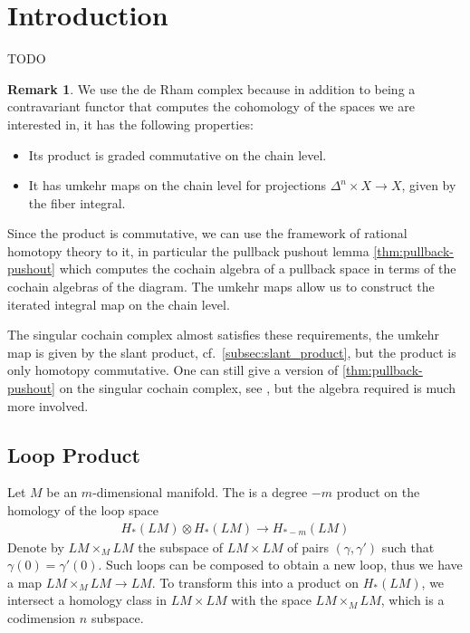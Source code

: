 \documentclass{scrartcl}
\let\emph\relax
\newcommand{\emphi}[1]{\index{#1}\emph{#1}}
\theoremstyle{plain}
\theoremstyle{definition}
\newtheorem{remark}[theorem]{Remark}
\begin{document}
\tableofcontents

\section{Introduction}
TODO

\begin{remark}
    We use the de Rham complex because in addition to being a contravariant functor that computes the cohomology of the spaces we are interested in, it has the following properties: 
    \begin{itemize}
        \item Its product is graded commutative on the chain level.
        \item It has umkehr maps on the chain level for projections $\Delta^n \times X\to X$, given by the fiber integral. 
    \end{itemize}
    Since the product is commutative, we can use the framework of rational homotopy theory to it, in particular the pullback pushout lemma \cref{thm:pullback-pushout} which computes the cochain algebra of a pullback space in terms of the cochain algebras of the diagram. The umkehr maps allow us to construct the iterated integral map on the chain level.

    The singular cochain complex almost satisfies these requirements, the umkehr map is given by the slant product, cf.\ \cref{subsec:slant_product}, but the product is only homotopy commutative. One can still give a version of \cref{thm:pullback-pushout} on the singular cochain complex, see \cite{Toen2019LePD}, but the algebra required is much more involved. 
\end{remark}

\subsection{Loop Product}\label{subsec:loop-product-classical}
Let $M$ be an $m$-dimensional manifold. The \emphi{loop product} is a degree $-m$ product on the homology of the loop space 
\begin{align*}
    H_*(LM)\otimes H_*(LM)\to H_{*-m}(LM)
\end{align*}
Denote by $LM\times_M LM$ the subspace of $LM\times LM$ of pairs $(\gamma, \gamma')$ such that $\gamma(0) = \gamma'(0)$. Such loops can be composed to obtain a new loop, thus we have a map $LM\times_M LM\to LM$. To transform this into a product on $H_*(LM)$, we intersect a homology class in $LM\times LM$ with the space $LM\times_M LM$, which is a codimension $n$ subspace.
\end{document}
